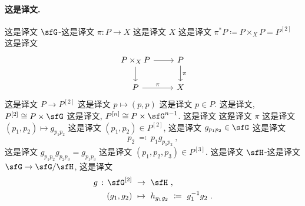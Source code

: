 \documentclass[
    affil-it, %
    auth-lg, %
    british, %
    compression, %
    contents, %
    custom-packages={}, %
    references={bigone}, %
]{lib/preprint}
\begin{document}
\begin{body}
        \paragraph{这是译文.}
 这是译文 $\sfG$-这是译文 $\pi:P\rightarrow X$ 这是译文 $X$ 这是译文 $\pi^*P\coloneqq P\times_XP=P^{[2]}$ 这是译文         \begin{equation}
            \begin{tikzcd}
                P\times_X P\arrow[r]\arrow[d] & P\arrow[d,"\pi"]
                \\
                P\arrow[r,"\pi"] & X
            \end{tikzcd}
        \end{equation}  这是译文 $P\rightarrow P^{[2]}$ 这是译文 $p\mapsto(p,p)$ 这是译文 $p\in P$. 这是译文, $P^{[2]}\cong P\times\sfG$ 这是译文, $P^{[n]}\cong P\times\sfG^{n-1}$. 这是译文 \v 这是译文 $\pi$ 这是译文 $(p_1,p_2)\mapsto g_{p_1p_2}$ 这是译文 $(p_1,p_2)\in P^{[2]}$, 这是译文 $g_{p_1p_2}\in \sfG$ 这是译文         \begin{equation}
            p_2\ \eqqcolon\ p_1g_{p_1p_2}~,
        \end{equation}  这是译文 $g_{p_1p_2}g_{p_2p_3}=g_{p_1p_3}$ 这是译文 $(p_1,p_2,p_3)\in P^{[3]}$. 这是译文 $\sfH$-这是译文 $\sfG\rightarrow\sfG/\sfH$, 这是译文         \begin{equation}
            \begin{aligned}
                g\,:\,\sfG^{[2]}\ &\rightarrow\ \sfH~,
                \\
                (g_1,g_2)\ &\mapsto\ h_{g_1g_2}\ \coloneqq\ g_1^{-1}g_2~.
            \end{aligned}
        \end{equation}
        

\end{body}
\end{document}

